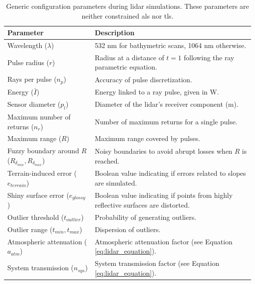 \renewcommand{\arraystretch}{1.2}
\begin{table}
    \small
    \caption{Generic configuration parameters during \acrshort{lidar} simulations. These parameters are neither constrained \acrshort{als} nor \acrshort{tls}. }
    \label{table:lidar_workflow_parameters}
    \begin{tabular}{ll}
    \toprule
    \textbf{Parameter} & \textbf{Description}\\
    \midrule
    Wavelength ($\lambda$) & 532 \si{\nano\meter} for bathymetric scans, 1064 \si{\nano\meter} otherwise.\\
    Pulse radius ($r$) & Radius at a distance of $t = 1$ following the ray parametric equation. \\
    Rays per pulse ($n_{p}$) & Accuracy of pulse discretization. \\
    Energy ($\bar{I}$) & Energy linked to a ray pulse, given in \si{\watt}. \\
    Sensor diameter ($p_{l}$) & Diameter of the \acrshort{lidar}'s receiver component (\si{\meter}). \\
    Maximum number of returns ($n_{r}$) & Number of maximum returns for a single pulse. \\
    Maximum range ($R$) & Maximum range covered by pulses.\\
    Fuzzy boundary around $R$ ($R_{\delta_{\textit{min}}}, R_{\delta_{\textit{max}}}$) & Noisy boundaries to avoid abrupt losses when $R$ is reached.\\
    Terrain-induced error ($e_{\textit{terrain}}$) & Boolean value indicating if errors related to slopes are simulated. \\
    Shiny surface error ($e_{\textit{glossy}}$) & Boolean value indicating if points from highly reflective surfaces are distorted. \\
    Outlier threshold ($t_{\textit{outlier}}$) & Probability of generating outliers. \\
    Outlier range ($t_{\textit{min}}, t_{\textit{max}}$) & Dispersion of outliers. \\
    Atmospheric attenuation ($a_{\textit{atm}}$) & Atmospheric attenuation factor (see Equation \ref{eq:lidar_equation}). \\
    System transmission ($n_{\textit{sys}}$) & System transmission factor (see Equation \ref{eq:lidar_equation}). \\
    \bottomrule
    \end{tabular}
    \libertineNormal
\end{table}
\renewcommand{\arraystretch}{1}

